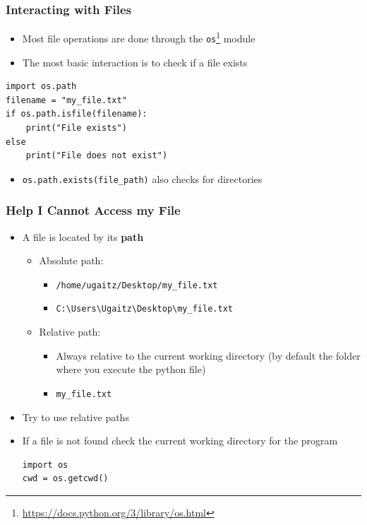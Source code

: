 \documentclass[11pt]{beamer}
\begin{document}
\begin{frame}[fragile]\frametitle{Interacting with Files}
\begin{itemize}
\item Most file operations are done through the \lstinline|os|\footnote{\href{https://docs.python.org/3/library/os.html}{https://docs.python.org/3/library/os.html}} module
\item The most basic interaction is to check if a file exists
\end{itemize}
\begin{lstlisting}[basicstyle=\small]
import os.path
filename = "my_file.txt"
if os.path.isfile(filename):
    print("File exists")
else
    print("File does not exist")
\end{lstlisting}
\begin{itemize}
\item \lstinline|os.path.exists(file_path)| also checks for directories
\end{itemize}
\end{frame}

\begin{frame}[fragile]\frametitle{Help I Cannot Access my File}
\begin{itemize}
\item A file is located by its \textbf{path}
    \begin{itemize}
    \item Absolute path: 
        \begin{itemize}
        \item \verb*|/home/ugaitz/Desktop/my_file.txt|
        \item \verb*|C:\Users\Ugaitz\Desktop\my_file.txt|
        \end{itemize}
    \item Relative path:
        \begin{itemize}
        \item Always relative to the current working directory (by default the folder where you execute the python file)
        \item \verb*|my_file.txt|
        \end{itemize}
    \end{itemize}
\item Try to use relative paths
\item If a file is not found check the current working directory for the program
\begin{lstlisting}[basicstyle=\small]
import os
cwd = os.getcwd()
\end{lstlisting}
\end{itemize}
\end{frame}
\end{document}
